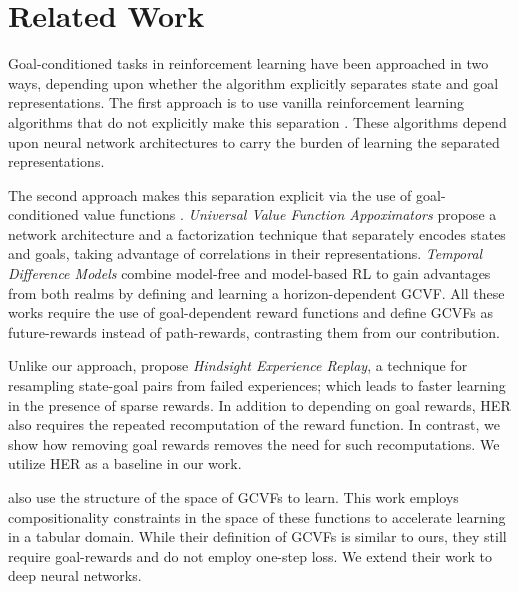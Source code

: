\section{Related Work}

Goal-conditioned tasks in reinforcement learning have been approached in two
ways, depending upon whether the algorithm explicitly separates state and goal
representations.
The first approach is to use vanilla reinforcement
learning algorithms that do not explicitly make this separation
\citep{mirowski2016learning,dosovitskiy2016learning,gupta2017cognitive,parisotto2017neural,mirowski2018learning}.
These algorithms depend upon neural network architectures to
carry the burden of learning the separated representations.

The second approach makes this separation explicit via the use of goal-conditioned value
functions \citep{foster2002structure,sutton2011horde}. \emph{Universal
Value Function Appoximators} \citep{schaul2015universal} propose a
network architecture and a factorization technique that separately
encodes states and goals, taking advantage of correlations in their representations.
\emph{Temporal Difference Models} combine model-free
and model-based RL to gain advantages from both realms by defining and learning
a horizon-dependent GCVF. All these works require the use of
goal-dependent reward functions and define GCVFs as future-rewards instead of
path-rewards, contrasting them from our contribution. 

Unlike our approach, \citet{andrychowicz2017hindsight} propose \emph{Hindsight Experience Replay},
a technique for resampling state-goal pairs from failed experiences; which leads
to faster learning in the presence of sparse rewards. In addition to depending
on goal rewards, HER also requires the repeated recomputation of the reward
function. In contrast, we show how removing goal rewards removes the need for
such recomputations. We utilize HER as a baseline in our work.

\citet{dhiman2018floydwarshall} also use the structure of the space of GCVFs to
learn.
This work employs compositionality constraints
in the space of these functions to accelerate learning in a tabular domain. While
their definition of GCVFs is similar to ours, they still require
goal-rewards and do not employ one-step loss. We extend their
work to deep neural networks.


